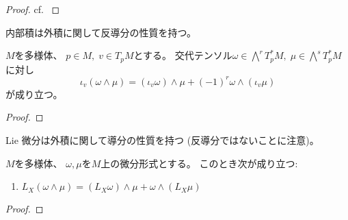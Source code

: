 \documentclass[report]{jlreq}
\begin{document}

\begin{proof}
    cf. \cite[p.361]{Lee12}
\end{proof}

内部積は外積に関して反導分の性質を持つ。

\begin{proposition}[外積に関する内部積の反導分性]
    $M$を多様体、
    $p \in M, \; v \in T_pM$とする。
    交代テンソル$\omega \in \bigwedge^r T_p^*M, \; \mu \in \bigwedge^s T_p^* M$
    に対し
    \begin{equation}
        \iota_v (\omega \wedge \mu)
            = (\iota_v \omega) \wedge \mu + (-1)^{r} \omega \wedge (\iota_v \mu)
    \end{equation}
    が成り立つ。
\end{proposition}

\begin{proof}
    \TODO{}
\end{proof}

Lie 微分は外積に関して導分の性質を持つ (反導分ではないことに注意)。

\begin{proposition}
    $M$を多様体、
    $\omega, \mu$を$M$上の微分形式とする。
    このとき次が成り立つ:
    \begin{enumerate}
        \item $L_X (\omega \wedge \mu)
            = (L_X \omega) \wedge \mu + \omega \wedge (L_X \mu)$
    \end{enumerate}
\end{proposition}

\begin{proof}
    \TODO{}
\end{proof}


%
\end{document}
